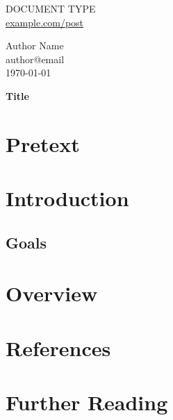 \documentclass[10pt]{article}
\makeatletter
\newcommand{\postType}{DOCUMENT TYPE}
\newcommand{\postTitle}{Title}
\newcommand{\postAuthor}{Author Name}
\newcommand{\postDate}{\today}
\newcommand{\postSite}{\href{https://example.com/post}{example.com/post}}
\newcommand{\authorContact}{author@email}
\makeatother
\begin{document}
\begin{multicols}{2}
	\begin{flushleft}
		\postType \\
		\postSite
	\end{flushleft}
\columnbreak
	\begin{flushright}
		\postAuthor \\
		\authorContact \\
		\postDate
	\end{flushright}
\end{multicols}

\vspace{1in} { \center \huge \textbf{\postTitle} \\ } \vspace{1in}

\begin{abstract}
	\lipsum[1]
\end{abstract}
\pagebreak

\tableofcontents
\pagebreak

\section*{Pretext}{
	\lipsum[1]
	\vspace{10px}
	\begin{quote}
		\begin{tcolorbox}[colback=blue!5!white,colframe=blue!75!black,title=\textbf{Disclaimer:} ]
			\lipsum[2]
		\end{tcolorbox}	  
	\end{quote}%
}

\pagebreak

\section{Introduction}{
    \lipsum[3]

	\subsection{Goals}{
		\lipsum[4]
	}
}

\pagebreak

\section{Overview}{
	\lipsum[5]
}

\newpage

\section{References}{
}
\pagebreak

\section{Further Reading}{
}
\end{document}

